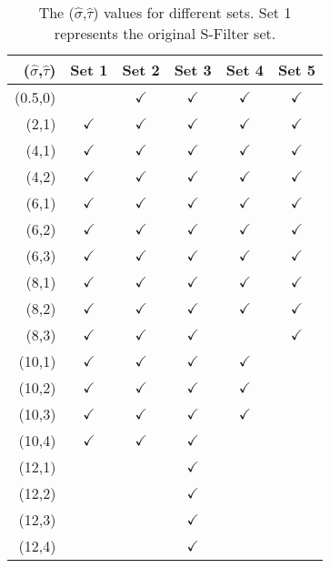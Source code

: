 \begin{table}[htb]
\footnotesize 
\centering
{}
\begin{tabular}{r|ccccc}%
\hline 
\scriptsize 
($\hat{\sigma}$,$\hat{\tau}$) & Set 1 & Set 2 & Set 3 & Set 4 & Set 5\\ \hline
(0.5,0) & \  & $\checkmark$ & $\checkmark$ & $\checkmark$ & $\checkmark$ \\ 
(2,1) & $\checkmark$ & $\checkmark$ & $\checkmark$ & $\checkmark$ & $\checkmark$  \\ 
(4,1) & $\checkmark$ & $\checkmark$ & $\checkmark$ & $\checkmark$ & $\checkmark$  \\
(4,2) & $\checkmark$ & $\checkmark$ & $\checkmark$ & $\checkmark$ & $\checkmark$  \\ 
(6,1) & $\checkmark$ & $\checkmark$ & $\checkmark$ & $\checkmark$ & $\checkmark$  \\
(6,2) & $\checkmark$ & $\checkmark$ & $\checkmark$ & $\checkmark$ & $\checkmark$  \\
(6,3) & $\checkmark$ & $\checkmark$ & $\checkmark$ & $\checkmark$ & $\checkmark$  \\ 
(8,1) & $\checkmark$ & $\checkmark$ & $\checkmark$ & $\checkmark$ & $\checkmark$  \\
(8,2) & $\checkmark$ & $\checkmark$ & $\checkmark$ & $\checkmark$ & $\checkmark$  \\
(8,3) & $\checkmark$ & $\checkmark$ & $\checkmark$ & \  & $\checkmark$  \\ 
(10,1) & $\checkmark$ & $\checkmark$ & $\checkmark$ & $\checkmark$ & \   \\
(10,2) & $\checkmark$ & $\checkmark$ & $\checkmark$ & $\checkmark$ & \   \\
(10,3) & $\checkmark$ & $\checkmark$ & $\checkmark$ & $\checkmark$ & \   \\
(10,4) & $\checkmark$ & $\checkmark$ & $\checkmark$ & \  & \   \\ 
(12,1) & \  & \  & $\checkmark$ & \  & \   \\
(12,2) & \  & \  & $\checkmark$ & \  & \   \\
(12,3) & \  & \  & $\checkmark$ & \  & \   \\
(12,4) & \  & \  & $\checkmark$ & \  & \   \\ 
\hline
\end{tabular}
\caption[Various sets of filters in the filter bank of our proposed cloud classification approach.]{The ($\hat{\sigma}$,$\hat{\tau}$) values for different sets. Set 1 represents the original S-Filter set.}
\label{filter_table}
\end{table}

